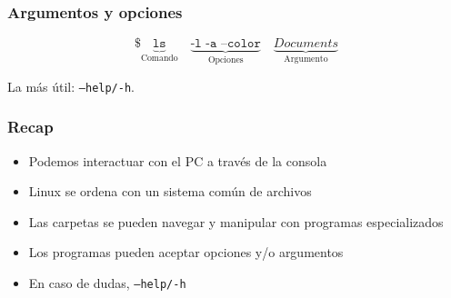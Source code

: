 \documentclass[14pt,aspectratio=169,xcolor=dvipsnames]{beamer}
\begin{document}
\begin{frame}\frametitle{Argumentos y opciones}
    
    $$ \texttt{\$ }\underbrace{\texttt{ls}}_\text{Comando} \quad \underbrace{\texttt{-l -a --color}}_\text{Opciones} \quad \underbrace{Documents}_\text{Argumento} $$

La más útil: \texttt{--help/-h}. 

\vspace{1cm}
\end{frame}
\begin{frame}\frametitle{Recap}
    \begin{itemize}
        \item Podemos interactuar con el PC a través de la consola
        \item Linux se ordena con un sistema común de archivos
        \item Las carpetas se pueden navegar y manipular con programas especializados
        \item Los programas pueden aceptar opciones y/o argumentos
        \item En caso de dudas, \texttt{--help/-h}
    \end{itemize}
\end{frame}
\begin{frame}
    \maketitle
\end{frame}
\end{document}
